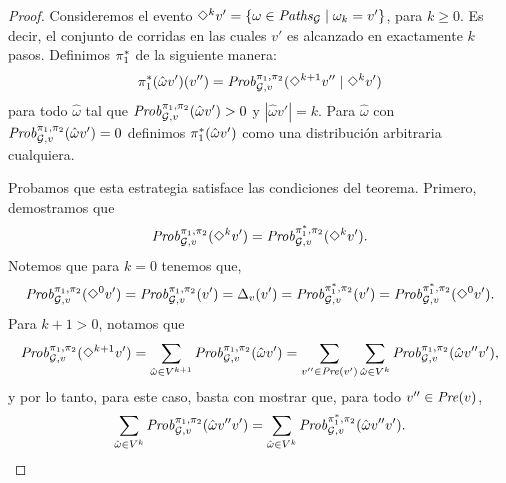 \begin{proof}
  Consideremos el evento $\Diamond^{k} v' = \{ \omega \in
  \mathit{Paths}_{\mathcal{G}} \mid \omega_k = v'\}$, para $k\geq 0$. Es decir,
  el conjunto de corridas en las cuales $v'$ es alcanzado en exactamente $k$ pasos.
  Definimos $\pi^*_{1}$ de la siguiente manera:
  \[
  \pi^*_{1}(\hat{\omega}v')(v'') =  \mathit{Prob}^{\pi_{1}, \pi_{2}}_{\mathcal{G},v}(\Diamond^{k+1} v'' \mid \Diamond^k v') 
  \]
  para todo $\hat{\omega}$ tal que
  $\mathit{Prob}^{\pi_{1}, \pi_{2}}_{\mathcal{G},v}(\hat{\omega}v') > 0$ y
  $|\hat{\omega}v'| = k$.  Para $\hat{\omega}$ con
  $\mathit{Prob}^{\pi_{1}, \pi_{2}}_{\mathcal{G},v}(\hat{\omega}v') = 0$ definimos $\pi^*_{1}(\hat{\omega}v')$ como una distribución arbitraria cualquiera.

  Probamos que esta estrategia satisface las condiciones del teorema.
  Primero, demostramos que
  \begin{equation}\label{equ:diamondk}
    \mathit{Prob}^{\pi_{1}, \pi_{2}}_{\mathcal{G},v}(\Diamond^{k} v') =
    \mathit{Prob}^{\pi^*_{1}, \pi_{2}}_{\mathcal{G},v}(\Diamond^{k} v').
  \end{equation}
  Notemos que para $k=0$ tenemos que,
  \[\mathit{Prob}^{\pi_{1}, \pi_{2}}_{\mathcal{G},v}(\Diamond^{0} v') =
  \mathit{Prob}^{\pi_{1}, \pi_{2}}_{\mathcal{G},v}(v') = \Delta_v(v') =
  \mathit{Prob}^{\pi^*_{1}, \pi_{2}}_{\mathcal{G},v}(v')=
  \mathit{Prob}^{\pi^*_{1}, \pi_{2}}_{\mathcal{G},v}(\Diamond^{0} v').\]
  Para $k + 1 > 0$, notamos que
  \[
  \mathit{Prob}^{\pi_{1}, \pi_{2}}_{\mathcal{G},v}(\Diamond^{k+1} v') = \sum_{\hat{\omega} \in V^{k+1}} \mathit{Prob}^{\pi_{1}, \pi_{2}}_{\mathcal{G},v}(\hat{\omega}v')  = \sum_{v'' \in \mathit{Pre}(v')}\sum_{\hat{\omega} \in V^k} \mathit{Prob}^{\pi_{1}, \pi_{2}}_{\mathcal{G},v}(\hat{\omega}v''v'),
  \] 
  y por lo tanto, para este caso, basta con mostrar que, para todo
  $v''\in\mathit{Pre}(v)$,
  \[
    \sum_{\hat{\omega} \in V^k} \mathit{Prob}^{\pi_{1}, \pi_{2}}_{\mathcal{G},v}(\hat{\omega}v''v') = \sum_{\hat{\omega} \in V^k} \mathit{Prob}^{\pi^*_{1}, \pi_{2}}_{\mathcal{G},v}(\hat{\omega}v''v').
  \]


\end{proof}
